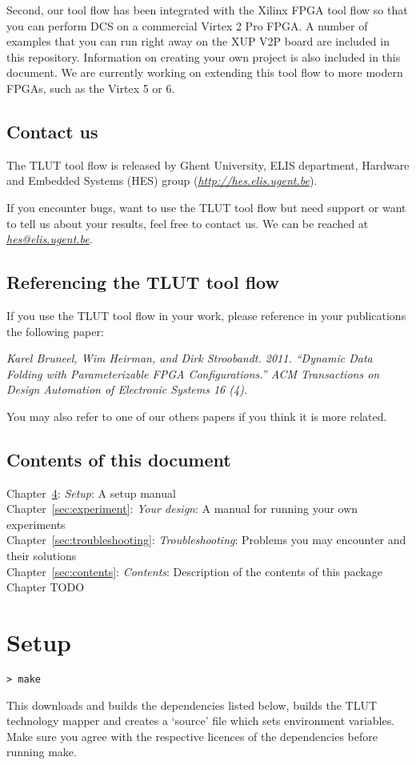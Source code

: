 \documentclass[a4paper,oneside]{memoir}
\begin{document}
Second, our tool flow has been integrated with the Xilinx FPGA tool flow so that you can perform DCS on a commercial Virtex 2 Pro FPGA.
A number of examples that you can run right away on the XUP V2P board are included in this repository. 
Information on creating your own project is also included in this document.
We are currently working on extending this tool flow to more modern FPGAs, such as the Virtex 5 or 6.

\section{Contact us}
The TLUT tool flow is released by Ghent University, ELIS department, Hardware and Embedded Systems (HES) group (\href{http://hes.elis.ugent.be}{\emph{http://hes.elis.ugent.be}}).

If you encounter bugs, want to use the TLUT tool flow but need support or want to tell us about your results, feel free to contact us.
We can be reached at \href{mailto:hes@elis.ugent.be}{\emph{hes@elis.ugent.be}}.

\section{Referencing the TLUT tool flow}
If you use the TLUT tool flow in your work, please reference in your publications the following paper:

\emph{Karel Bruneel, Wim Heirman, and Dirk Stroobandt. 2011. ``Dynamic Data Folding with Parameterizable FPGA Configurations.'' ACM Transactions on Design Automation of Electronic Systems 16 (4).}

You may also refer to one of our others papers if you think it is more related.

\section{Contents of this document}
Chapter~\ref{sec:setup}: \emph{Setup}: A setup manual\\
Chapter~\ref{sec:experiment}: \emph{Your design}: A manual for running your own experiments\\
Chapter~\ref{sec:troubleshooting}: \emph{Troubleshooting}: Problems you may encounter and their solutions\\
Chapter~\ref{sec:contents}: \emph{Contents}: Description of the contents of this package\\
Chapter TODO

\clearpage
\chapter{Setup}\label{sec:setup}
\begin{lstlisting}
> make
\end{lstlisting}
This downloads and builds the dependencies listed below, builds the TLUT technology mapper and creates a `source' file which sets environment variables. 
Make sure you agree with the respective licences of the dependencies before running make. 
\end{document}
